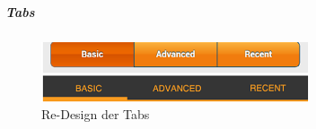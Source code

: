 \subparagraph{Tabs}
\label{sub:tabs}

\begin{figure}[h]
 \centering
 \includegraphics[height=0.25\textheight]{img/tabs.png}
 \caption{Re-Design der Tabs}
 \label{fig:tabs}
\end{figure}